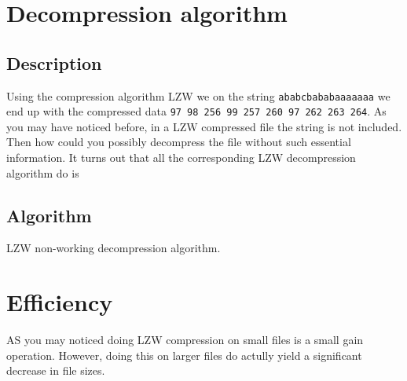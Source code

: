 \begin{refsection}
\section{Decompression algorithm}

\subsection{Description}

Using the compression algorithm LZW we on the string
\texttt{ababcbababaaaaaaa} we end up with the compressed data
\texttt{97 98 256 99 257 260 97 262 263 264}. As you may have noticed
before, in a LZW compressed file the string is not included. Then how
could you possibly decompress the file without such essential
information. It turns out that all the corresponding LZW decompression
algorithm do is

\subsection{Algorithm}

\begin{algorithm}[H]
  \caption{LZW non-working decompression algorithm.}
  \label{alg:lzw-non-working-decompression}
  \begin{algorithmic}[1]
    \State {}
    \While{\neof}


      \State {}

      \State {}

    \EndWhile
  \end{algorithmic}
\end{algorithm}

\section{Efficiency}

AS you may noticed doing LZW compression on small files is a small
gain operation. However, doing this on larger files do actully yield a
significant decrease in file sizes.

\FloatBarrier

\printbibliography[heading=subbibliography]

\end{refsection}
